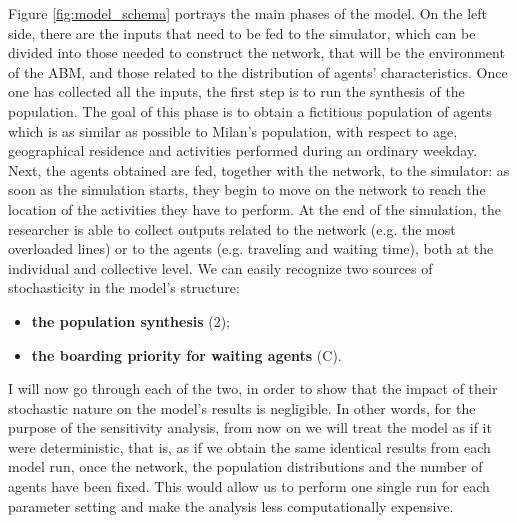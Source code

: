 Figure \ref{fig:model_schema} portrays the main phases of the model. On the left side, there are the inputs that need to be fed to the simulator, which can be divided into those needed to construct the network, that will be the environment of the ABM, and those related to the distribution of agents' characteristics. Once one has collected all the inputs, the first step is to run the synthesis of the population. The goal of this phase is to obtain a fictitious population of agents which is as similar as possible to Milan's population, with respect to age, geographical residence and activities performed during an ordinary weekday. Next, the agents obtained are fed, together with the network, to the simulator: as soon as the simulation starts, they begin to move on the network to reach the location of the activities they have to perform. At the end of the simulation, the researcher is able to collect outputs related to the network (e.g. the most overloaded lines) or to the agents (e.g. traveling and waiting time), both at the individual and collective level. 
We can easily recognize two sources of stochasticity in the model's structure:
\begin{itemize}
	\item \textbf{the population synthesis} (2);
	\item \textbf{the boarding priority for waiting agents} (C). 
\end{itemize}
I will now go through each of the two, in order to show that the impact of their stochastic nature on the model's results is negligible. In other words, for the purpose of the sensitivity analysis, from now on we will treat the model as if it were deterministic, that is, as if we obtain the same identical results from each model run, once the network, the population distributions and the number of agents have been fixed. This would allow us to perform one single run for each parameter setting and make the analysis less computationally expensive.

